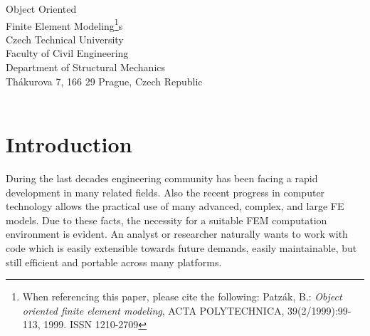 \begin{htmlonly}
\begin{center}
{\Large Object Oriented\\ Finite Element Modeling\footnote{When
referencing this paper, please cite the following: Patz\'{a}k, B.:
{\em Object oriented finite element modeling}, ACTA POLYTECHNICA, 39(2/1999):99-113, 1999. ISSN 1210-2709}}s
{\bp \\ 
Czech Technical University\\
Faculty of Civil Engineering\\
Department of Structural Mechanics\\
Th\'akurova 7, 166 29 Prague, Czech Republic\\ \\
}




\section{Introduction}

During the last decades engineering community has been facing a rapid
development in many related fields. Also the recent progress in
computer technology allows the practical use of many advanced, complex, and large FE models. 
Due to these facts, the necessity for a suitable FEM computation
environment is evident. An analyst or researcher naturally wants to
work with code which is easily extensible towards future demands, easily maintainable, but still efficient and portable across many platforms. 


\end{center}
\end{htmlonly}
